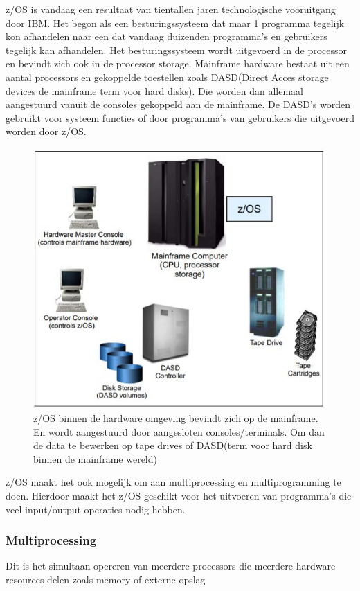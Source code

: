 z/OS is vandaag een resultaat van tientallen jaren technologische vooruitgang door IBM. Het begon als een besturingssysteem dat maar 1 programma tegelijk kon afhandelen naar een dat vandaag duizenden programma's en gebruikers tegelijk kan afhandelen. Het besturingssysteem wordt uitgevoerd in de processor en bevindt zich ook in de processor storage. Mainframe hardware bestaat uit een aantal processors en gekoppelde toestellen zoals DASD(Direct Acces storage devices de mainframe term voor hard disks). Die worden dan allemaal aangestuurd vanuit de consoles gekoppeld aan de mainframe. De DASD's worden gebruikt voor systeem functies of door programma's van gebruikers die uitgevoerd worden door z/OS. \cite{Ebbers2011}

\begin{figure}[h]
	\centering
	\includegraphics{img/Omgeving_zOS}
	\caption[z/OS binnen de mainframe omgeving]{z/OS binnen de hardware omgeving bevindt zich op de mainframe. En wordt aangestuurd door aangesloten consoles/terminals. Om dan de data te bewerken op tape drives of DASD(term voor hard disk binnen de mainframe wereld)}
	\label{fig:omgevingzos}
\end{figure}

z/OS maakt het ook mogelijk om aan multiprocessing en multiprogramming te doen. Hierdoor maakt het z/OS geschikt voor het uitvoeren van programma's die veel input/output operaties nodig hebben. 

\subsubsection{Multiprocessing}
\label{subsubsec:Multiprocessing}
Dit is het simultaan opereren van meerdere processors die meerdere hardware resources delen zoals memory of externe opslag

